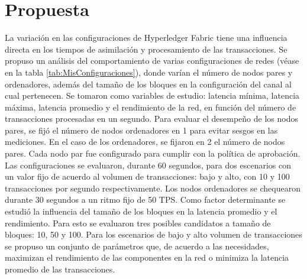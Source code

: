 \chapter{Propuesta}\label{chapter:proposal}

La variaci\'on en las configuraciones de Hyperledger Fabric tiene una influencia directa en los tiempos de asimilaci\'on y procesamiento de las transacciones. Se propuso un an\'alisis del comportamiento de varias configuraciones de redes (v\'ease en la tabla \ref{tab:MisConfiguraciones}), donde var\'ian el n\'umero de nodos pares y ordenadores, adem\'as del tama\~no de los bloques en la configuraci\'on del canal al cual pertenecen. Se tomaron como variables de estudio: latencia m\'inima, latencia m\'axima, latencia promedio y el rendimiento de la red, en funci\'on del n\'umero de transacciones procesadas en un segundo. Para evaluar el desempe\~no de los nodos pares, se fij\'o el n\'umero de nodos ordenadores en 1 para evitar sesgos en las mediciones. En el caso de los ordenadores, se fijaron en 2 el n\'umero de nodos pares. Cada nodo par fue configurado para cumplir con la pol\'itica de aprobaci\'on. Las configuraciones se evaluaron, durante 60 segundos, para dos escenarios con un valor fijo de acuerdo al volumen de transacciones: bajo y alto, con 10 y 100 transacciones por segundo respectivamente. Los nodos ordenadores se chequearon durante 30 segundos a un ritmo fijo de 50 TPS. Como factor determinante se estudi\'o la influencia del tama\~no de los bloques en la latencia promedio y el rendimiento. Para esto se evaluaron tres posibles candidatos a tama\~no de bloques: 10, 50 y 100. Para los escenarios de bajo y alto volumen de transacciones se propuso un conjunto de par\'ametros que, de acuerdo a las necesidades, maximizan el rendimiento de las componentes en la red o minimiza la latencia promedio de las transacciones.